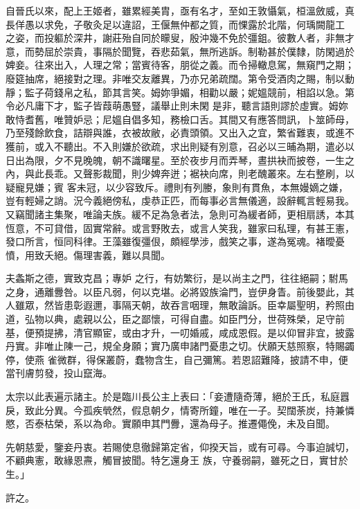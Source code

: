 \begin{pinyinscope}
 自晉氏以來，配上王姬者，雖累經美胄，亟有名才，至如王敦懾氣，桓溫斂威，真長佯愚以求免，子敬灸足以違詔，王偃無仲都之質，而惈露於北階，何瑀闕龍工
 之姿，而投軀於深井，謝莊殆自同於矇叟，殷沖幾不免於彊鉏。彼數人者，非無才意，而勢屈於崇貴，事隔於聞覽，吞悲茹氣，無所逃訴。制勒甚於僕隸，防閑過於婢妾。往來出入，人理之常；當賓待客，朋從之義。而令掃轍息駕，無窺門之期；廢筵抽席，絕接對之理。非唯交友離異，乃亦兄弟疏闊。第令受酒肉之賜，制以動靜；監子荷錢帛之私，節其言笑。姆妳爭媚，相勸以嚴；妮媼競前，相諂以急。第令必凡庸下才，監子皆葭萌愚豎，議舉止則未閑
 是非，聽言語則謬於虛實。姆妳敢恃耆舊，唯贊妒忌；尼媼自倡多知，務檢口舌。其間又有應答問訊，卜筮師母，乃至殘餘飲食，詰辯與誰，衣被故敝，必責頭領。又出入之宜，繁省難衷，或進不獲前，或入不聽出。不入則嫌於欲疏，求出則疑有別意，召必以三晡為期，遣必以日出為限，夕不見晚魄，朝不識曙星。至於夜步月而弄琴，晝拱袂而披卷，一生之內，與此長乖。又聲影裁聞，則少婢奔迸；裾袂向席，則老醜叢來。左右整刷，以疑寵見嫌；賓
 客未冠，以少容致斥。禮則有列媵，象則有貫魚，本無嫚嫡之嫌，豈有輕婦之誚。況今義絕傍私，虔恭正匹，而每事必言無儀適，設辭輒言輕易我。又竊聞諸主集聚，唯論夫族。緩不足為急者法，急則可為緩者師，更相扇誘，本其恆意，不可貸借，固實常辭。或言野敗去，或言人笑我，雖家曰私理，有甚王憲，發口所言，恒同科律。王藻雖復彊佷，頗經學涉，戲笑之事，遂為冤魂。褚曖憂憤，用致夭絕。傷理害義，難以具聞。



 夫螽斯之德，實致克昌；專妒
 之行，有妨繁衍，是以尚主之門，往往絕嗣；駙馬之身，通離釁咎。以臣凡弱，何以克堪。必將毀族淪門，豈伊身眚。前後嬰此，其人雖眾，然皆患彰遐邇，事隔天朝，故吞言咽理，無敢論訴。臣幸屬聖明，矜照由道，弘物以典，處親以公，臣之鄙懷，可得自盡。如臣門分，世荷殊榮，足守前基，便預提拂，清官顯宦，或由才升，一叨婚戚，咸成恩假。是以仰冒非宜，披露丹實。非唯止陳一己，規全身願；實乃廣申諸門憂患之切。伏願天慈照察，特賜蠲停，使燕
 雀微群，得保叢蔚，蠢物含生，自己彌篤。若恩詔難降，披請不申，便當刊膚剪發，投山竄海。



 太宗以此表遍示諸主。於是臨川長公主上表曰：「妾遭隨奇薄，絕於王氏，私庭囂戾，致此分異。今孤疾煢然，假息朝夕，情寄所鐘，唯在一子。契闊荼炭，持兼憐愍，否泰枯榮，系以為命。實願申其門釁，還為母子。推遷僶俛，未及自聞。



 先朝慈愛，鑒妾丹衷。若賜使息徹歸第定省，仰揆天旨，或有可尋。今事迫誠切，不顧典憲，敢緣恩燾，觸冒披聞。特乞還身王
 族，守養弱嗣，雖死之日，實甘於生。」



 許之。




\end{pinyinscope}
